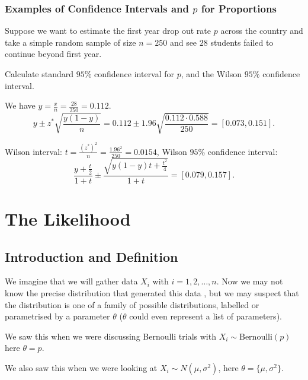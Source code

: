 \documentclass[10pt, a4paper]{article}
\begin{document}
\subsubsection{Examples of Confidence Intervals and \texorpdfstring{$p$}{} for Proportions}

\begin{example}
    Suppose we want to estimate the first year drop out rate $p$ across the country and take a simple random sample of size $n = 250$ and see $28$ students failed to continue beyond first year.

    Calculate standard $95\%$ confidence interval for $p$,
    and the Wilson $95\%$ confidence interval.

    \begin{solution}
        We have $y = \frac{x}{n} = \frac{28}{250} = 0.112$.
        \[
        y \pm z ^ {*}\sqrt{\frac{y(1 - y)}{n}} = 0.112 \pm 1.96\sqrt{\frac{0.112 \cdot 0.588}{250}} = [0.073, 0.151].
        \]

        Wilson interval:
        $t = \frac{(z ^ {*}) ^ 2}{n} = \frac{1.96 ^ 2}{250} = 0.0154$,
        Wilson $95\%$ confidence interval:
        \[
        \frac{y + \frac{t}{2}}{1 + t} \pm \frac{\sqrt{y(1 - y)t + \frac{t ^ 2}{4}}}{1 + t} = [0.079, 0.157].
        \]
    \end{solution}
\end{example}

\newpage

\section{The Likelihood}

\subsection{Introduction and Definition}

We imagine that we will gather data $X_i$ with $i = 1, 2, \dotsc, n$.
Now we may not know the precise distribution that generated this data ,
but we may suspect that the distribution is one of a family of possible distributions,
labelled or parametrised by a parameter $\theta$
($\theta$ could even represent a list of parameters).

We saw this when we were discussing Bernoulli trials with $X_i \sim \mathrm{Bernoulli}(p)$ here $\theta = p$.

We also saw this when we were looking at $X_i \sim N(\mu, \sigma ^ 2)$,
here $\theta = \{\mu, \sigma ^ 2\}$.
\end{document}
